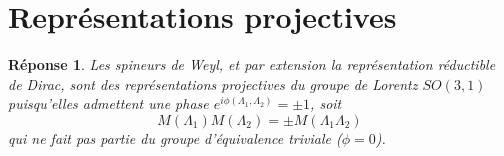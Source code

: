 \documentclass{article}
\numberwithin{equation}{section}
\theoremstyle{solution}
\newtheorem{solution}{Réponse}[section]
\begin{document}
\section{Représentations projectives}
\begin{solution}
Les spineurs de Weyl, et par extension la représentation réductible de Dirac, 
sont des représentations projectives du groupe de Lorentz $SO(3, 1)$ puisqu'elles admettent 
une phase $e^{i\phi(\Lambda_1, \Lambda_2)} = \pm 1 $, soit
\begin{equation}
        M(\Lambda_1) M(\Lambda_2) = \pm M(\Lambda_1 \Lambda_2)
\end{equation} 
qui ne fait pas partie du groupe d'équivalence triviale ($\phi = 0$). 
\end{solution}
\end{document}
